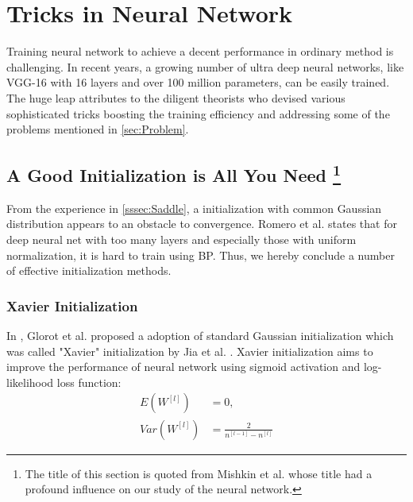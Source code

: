 \section{Tricks in Neural Network}
\label{sec:Solution}
Training neural network to achieve a decent performance in ordinary method
is challenging. In recent years, a growing number of ultra deep neural 
networks, like VGG-16 with 16 layers and over 100 million parameters, 
can be easily trained. The huge leap attributes to the diligent theorists
who devised various sophisticated tricks boosting the training efficiency
and addressing some of the problems mentioned in \autoref{sec:Problem}. 

\subsection{A Good Initialization is All You Need \protect\footnote{The 
title of this section is quoted from Mishkin et al. \parencite{mishkin2015all} whose
title had a profound influence on our study of the neural network.}}

From the experience in \autoref{sssec:Saddle}, a initialization with common 
Gaussian distribution appears to an obstacle to convergence. Romero et al.
\parencite{romero2014fitnets} states that for deep neural net with too many 
layers and especially those with uniform normalization, it is hard to train 
using BP. Thus, we hereby conclude a number of effective initialization methods.

\subsubsection{Xavier Initialization}
In \parencite{glorot2010understanding}, Glorot et al. proposed a adoption of standard
Gaussian initialization which was called "Xavier" initialization by Jia et al.
\parencite{jia2014caffe}. Xavier initialization aims to improve the performance of 
neural network using sigmoid activation and log-likelihood loss function:
\begin{equation}
    \label{equ:Xavier}
    \begin{split}
        E(W^{[l]}) & = 0, \\
        Var(W^{[l]}) & = \frac{2}{n^{[l-1]} - n^{[l]}}
    \end{split}
\end{equation}

